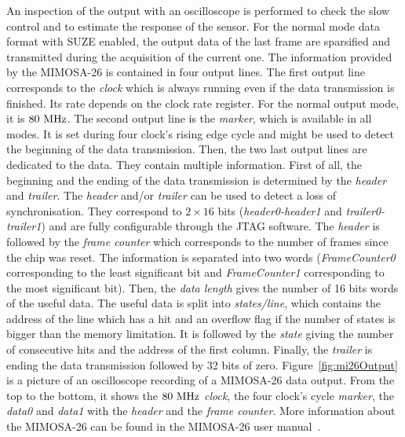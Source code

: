   An inspection of the output with an oscilloscope is performed to check the slow control and to estimate the response of the sensor.
  For the normal mode data format with \gls{SUZE} enabled, the output data of the last frame are sparsified and transmitted during the acquisition of the current one.
  The information provided by the \gls{MIMOSA}-26 is contained in four output lines.
  The first output line corresponds to the \textit{clock} which is always running even if the data transmission is finished. 
  Its rate depends on the clock rate register. 
  For the normal output mode, it is $80~\rm{MHz}$.
  The second output line is the \textit{marker}, which is available in all modes.
  It is set during four clock's rising edge cycle and might be used to detect the beginning of the data transmission.
  Then, the two last output lines are dedicated to the data.
  They contain multiple information.
  First of all, the beginning and the ending of the data transmission is determined by the \textit{header} and \textit{trailer}.
  The \textit{header} and/or \textit{trailer} can be used to detect a loss of synchronisation.
  They correspond to $2 \times 16$ bits (\textit{header0-header1} and \textit{trailer0-trailer1}) and are fully configurable through the \gls{JTAG} software.
  The \textit{header} is followed by the \textit{frame counter} which corresponds to the number of frames since the chip was reset. 
  The information is separated into two words (\textit{FrameCounter0} corresponding to the least significant bit and \textit{FrameCounter1} corresponding to the most significant bit).
  Then, the \textit{data length} gives the number of 16 bits words of the useful data. 
  The useful data is split into \textit{states/line}, which contains the address of the line which has a hit and an overflow flag if the number of states is bigger than the memory limitation.
  It is followed by the \textit{state} giving the number of consecutive hits and the address of the first column.
  Finally, the \textit{trailer} is ending the data transmission followed by 32 bits of zero.
  Figure~\ref{fig:mi26Output} is a picture of an oscilloscope recording of a \gls{MIMOSA}-26 data output. From the top to the bottom, it shows the $80~\rm{MHz}$ \textit{clock}, the four clock's cycle \textit{marker}, the \textit{data0} and \textit{data1} with the \textit{header} and the \textit{frame counter}.
  More information about the \gls{MIMOSA}-26 can be found in the \gls{MIMOSA}-26 user manual~\cite{manualMi26}.

